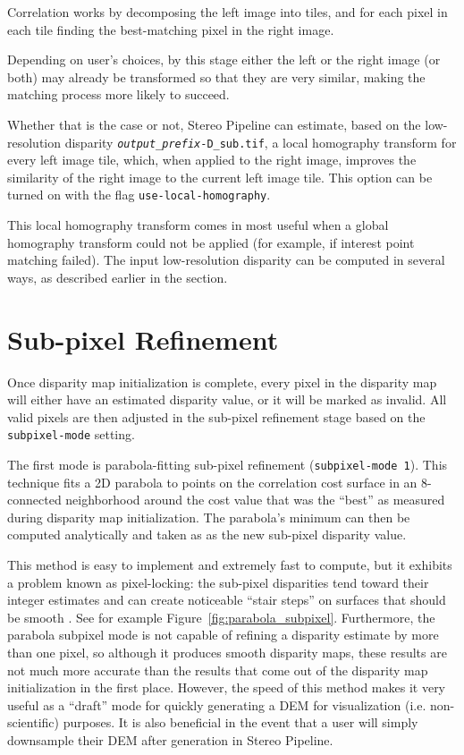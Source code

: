 Correlation works by decomposing the left image into tiles, and for each
pixel in each tile finding the best-matching pixel in the right image.

Depending on user's choices, by this stage either the left or the right
image (or both) may already be transformed so that they are very
similar, making the matching process more likely to succeed.

Whether that is the case or not, Stereo Pipeline can estimate, based on
the low-resolution disparity
\texttt{\textit{output\_prefix}-D\_sub.tif}, a local homography transform
for every left image tile, which, when applied to the right image,
improves the similarity of the right image to the current left image tile. This
option can be turned on with the flag \texttt{use-local-homography}.

This local homography transform comes in most useful when a global
homography transform could not be applied (for example, if interest
point matching failed). The input low-resolution disparity can be
computed in several ways, as described earlier in the section.


\section{Sub-pixel Refinement}
\label{sec:subpixel}

Once disparity map initialization is complete, every pixel in the
disparity map will either have an estimated disparity value, or it
will be marked as invalid.  All valid pixels are then adjusted in the
sub-pixel refinement stage based on the \texttt{subpixel-mode}
setting. %

The first mode is parabola-fitting sub-pixel refinement
(\texttt{subpixel-mode 1}).  This technique fits a 2D parabola to
points on the correlation cost surface in an 8-connected neighborhood
around the cost value that was the ``best'' as measured during
disparity map initialization. The parabola's minimum can then be
computed analytically and taken as as the new sub-pixel disparity
value.

This method is easy to implement and extremely fast to compute, but it
exhibits a problem known as pixel-locking: the sub-pixel disparities
tend toward their integer estimates and can create noticeable ``stair
steps'' on surfaces that should be smooth
\citep{Stein06:attenuating,Szeliski03sampling}.  See
for example Figure~\ref{fig:parabola_subpixel}. Furthermore, the parabola
subpixel mode is not capable of refining a disparity estimate by more
than one pixel, so although it produces smooth disparity maps, these
results are not much more accurate than the results that come out of
the disparity map initialization in the first place.  However, the
speed of this method makes it very useful as a ``draft'' mode for
quickly generating a \ac{DEM} for visualization (i.e. non-scientific)
purposes. It is also beneficial in the event that a user will simply
downsample their DEM after generation in Stereo Pipeline.

